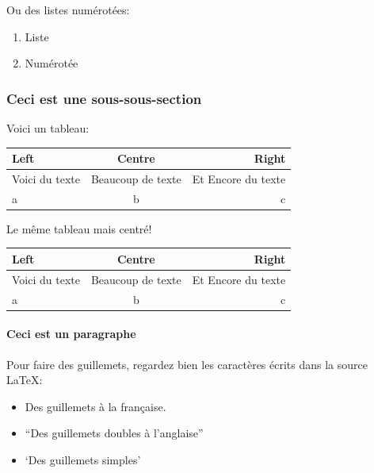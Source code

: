 \documentclass[paper=a4, fontsize=11pt]{article}
\begin{document}
\vspace{0.5cm} %

Ou des listes numérotées:
\begin{enumerate}
\item Liste
\item Numérotée
\end{enumerate}

\subsubsection{Ceci est une sous-sous-section}

Voici un tableau:\\ %

\begin{tabular}{lcr} %
\toprule
Left & Centre & Right \\
\midrule
Voici du texte & Beaucoup de texte & Et Encore du texte \\
a & b & c \\
\bottomrule
\end{tabular}

\vspace{0.5cm} %

Le même tableau mais centré!

\begin{center}
\begin{tabular}{lcr} %
\toprule
Left & Centre & Right \\
\midrule
Voici du texte & Beaucoup de texte & Et Encore du texte \\
a & b & c \\
\bottomrule
\end{tabular}
\end{center}

\paragraph{Ceci est un paragraphe}
Pour faire des guillemets, regardez bien les caractères écrits dans la source \LaTeX: 
\begin{itemize}
\item \og Des guillemets à la française\fg{}.
\item ``Des guillemets doubles à l'anglaise''
\item `Des guillemets simples'
\end{itemize}
\end{document}
